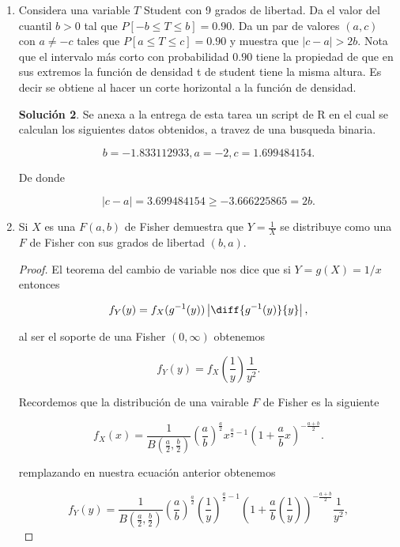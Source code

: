 \documentclass[letterpaper]{article}
\theoremstyle{definition}
\theoremstyle{lemathm}
\theoremstyle{lemathm}
\newtheorem{sol}{Solución}
\theoremstyle{lemathm}
\theoremstyle{lemademthm}
\newcommand{\abs}[1]{\left| #1 \right| }
\newcommand{\pars}[1]{\left( #1 \right) }
\newcommand{\1}{\mathbbm{1}}
\begin{document}
\begin{enumerate}
\begin{sol}
			\[F(\theta; \theta, \sigma) = G\pars{\frac{\theta-\theta}{\sigma}} = G(0)\]
		\end{sol}

		\item Considera una variable $T$ Student con 9 grados de libertad. Da el valor del cuantil $b > 0$ tal que $P[-b \leq T \leq b] = 0.90$. Da un par de valores $(a,c)$ con $a \neq -c$ tales que $P[a \leq T \leq c] = 0.90$ y muestra que $|c-a| > 2b$. Nota que el intervalo más corto con probabilidad $0.90$ tiene la propiedad de que en sus extremos la función de densidad t de student tiene la misma altura. Es decir se obtiene al hacer un corte horizontal a la función de densidad.
		
		\begin{sol}
			Se anexa a la entrega de esta tarea un script de R en el cual se calculan los siguientes datos obtenidos, a travez de una busqueda binaria.

			\[b = -1.833112933, a = -2, c = 1.699484154.\]

			De donde

			\[|c-a| = 3.699484154 \geq -3.666225865 = 2b.\]

		\end{sol}
		
		\item Si $X$ es una $F(a,b)$ de Fisher demuestra que $Y = \frac{1}{X}$ se distribuye como una $F$ de Fisher con sus grados de libertad $(b,a)$.
		
		\begin{proof}
			El teorema del cambio de variable nos dice que si $Y = g(X) = 1/x$ entonces

			\[f_Y(y) = f_X(g^{-1}(y)) \abs{\diff{g^{-1}(y)}{y}},\]

			al ser el soporte de una Fisher $(0,\infty)$ obtenemos

			\[f_Y(y) = f_X\pars{\frac{1}{y}} \frac{1}{y^2}.\]

			Recordemos que la distribución de una vairable $F$ de Fisher es la siguiente 

			\[f_X(x) = \frac{1}{B\pars{\frac{a}{2},\frac{b}{2}}} \pars{\frac{a}{b}}^{\frac{a}{2}} x^{\frac{a}{2}-1} \pars{1+\frac{a}{b}x}^{-\frac{a+b}{2}}.\]

			remplazando en nuestra ecuación anterior obtenemos

			\[f_Y(y) = \frac{1}{B\pars{\frac{a}{2},\frac{b}{2}}} \pars{\frac{a}{b}}^{\frac{a}{2}} \pars{\frac{1}{y}}^{\frac{a}{2}-1} \pars{1+\frac{a}{b}\pars{\frac{1}{y}}}^{-\frac{a+b}{2}} \frac{1}{y^2},\]


\end{proof}
\end{enumerate}
\end{document}
